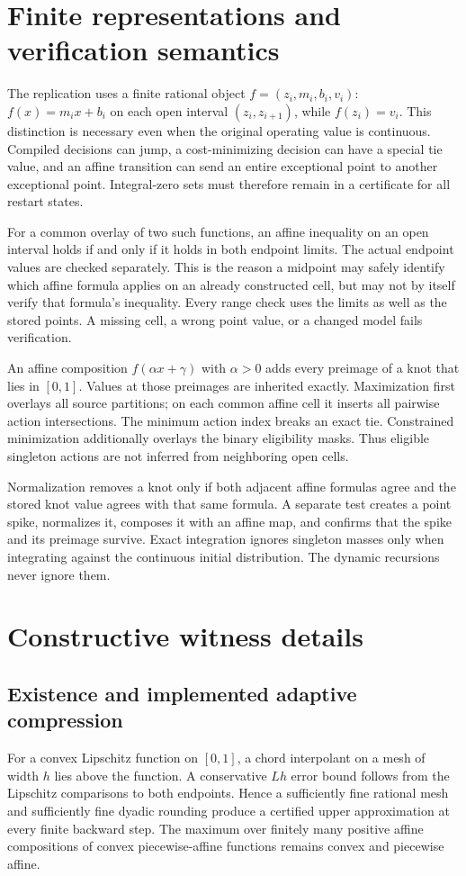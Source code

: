 \section{Finite representations and verification semantics}\label{app:representation}
The replication uses a finite rational object $f=(z_i,m_i,b_i,v_i)$: $f(x)=m_ix+b_i$ on each open interval $(z_i,z_{i+1})$, while $f(z_i)=v_i$. This distinction is necessary even when the original operating value is continuous. Compiled decisions can jump, a cost-minimizing decision can have a special tie value, and an affine transition can send an entire exceptional point to another exceptional point. Integral-zero sets must therefore remain in a certificate for all restart states.

For a common overlay of two such functions, an affine inequality on an open interval holds if and only if it holds in both endpoint limits. The actual endpoint values are checked separately. This is the reason a midpoint may safely identify which affine formula applies on an already constructed cell, but may not by itself verify that formula's inequality. Every range check uses the limits as well as the stored points. A missing cell, a wrong point value, or a changed model fails verification.

An affine composition $f(\alpha x+\gamma)$ with $\alpha>0$ adds every preimage of a knot that lies in $[0,1]$. Values at those preimages are inherited exactly. Maximization first overlays all source partitions; on each common affine cell it inserts all pairwise action intersections. The minimum action index breaks an exact tie. Constrained minimization additionally overlays the binary eligibility masks. Thus eligible singleton actions are not inferred from neighboring open cells.

Normalization removes a knot only if both adjacent affine formulas agree and the stored knot value agrees with that same formula. A separate test creates a point spike, normalizes it, composes it with an affine map, and confirms that the spike and its preimage survive. Exact integration ignores singleton masses only when integrating against the continuous initial distribution. The dynamic recursions never ignore them.

\section{Constructive witness details}\label{app:witness}
\subsection{Existence and implemented adaptive compression}
For a convex Lipschitz function on $[0,1]$, a chord interpolant on a mesh of width $h$ lies above the function. A conservative $Lh$ error bound follows from the Lipschitz comparisons to both endpoints. Hence a sufficiently fine rational mesh and sufficiently fine dyadic rounding produce a certified upper approximation at every finite backward step. The maximum over finitely many positive affine compositions of convex piecewise-affine functions remains convex and piecewise affine.

